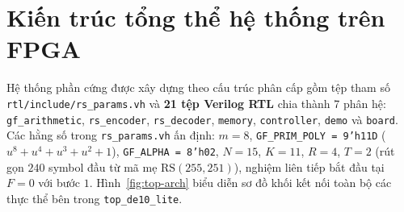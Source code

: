 \section{Kiến trúc tổng thể hệ thống trên FPGA}
\label{sec:top-arch}

Hệ thống phần cứng được xây dựng theo cấu trúc phân cấp gồm tệp tham số \texttt{rtl/include/rs\_params.vh} và \textbf{21 tệp Verilog RTL} chia thành 7 phân hệ: \texttt{gf\_arithmetic}, \texttt{rs\_encoder}, \texttt{rs\_decoder}, \texttt{memory}, \texttt{controller}, \texttt{demo} và \texttt{board}. Các hằng số trong \texttt{rs\_params.vh} ấn định: $m = 8$, \texttt{GF\_PRIM\_POLY = 9'h11D} ($u^8+u^4+u^3+u^2+1$), \texttt{GF\_ALPHA = 8'h02}, $N = 15$, $K = 11$, $R = 4$, $T = 2$ (rút gọn $240$ symbol đầu từ mã mẹ $\mathrm{RS}(255,251)$), nghiệm liên tiếp bắt đầu tại $F = 0$ với bước $1$. Hình~\ref{fig:top-arch} biểu diễn sơ đồ khối kết nối toàn bộ các thực thể bên trong \texttt{top\_de10\_lite}.

